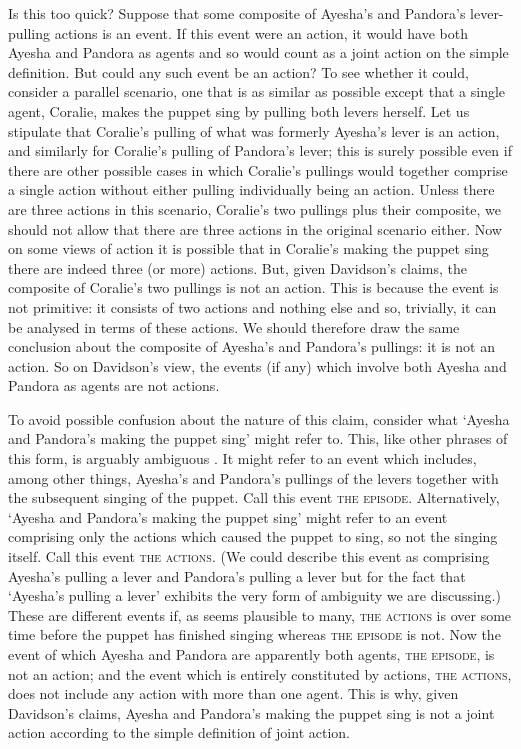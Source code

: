 \documentclass[12pt,a4paper]{extarticle}
\begin{document}
Is this too quick?  
Suppose that some composite of Ayesha's and Pandora's lever-pulling actions is an event.
If this event were an action, it would have both Ayesha and Pandora as agents and so would count as a joint action on the simple definition.
But could any such event be an action?
To see whether it could, 
consider a parallel scenario, one that is as similar as possible  except that a single agent, Coralie, makes the puppet sing by pulling both levers herself.
Let us stipulate that Coralie's pulling of what was formerly Ayesha's lever is an action, and similarly for Coralie's pulling of Pandora's lever; this is surely possible even if there are other possible cases in which Coralie's pullings would together comprise a single action without either pulling individually being an action.
Unless there are three actions in this scenario, Coralie's two pullings plus their composite, we should not allow that there are three actions in the original scenario either.
Now on  some views of action it is possible that in Coralie's making the puppet sing there are indeed three (or more) actions.
But, given Davidson's claims, the composite of Coralie's two pullings is not an action.
This is because the event is not primitive: it consists of two actions and nothing else and so, trivially, it can be analysed in terms of these actions.
We should therefore draw the same conclusion about the composite of Ayesha's and Pandora's pullings: it is not an action.
So on Davidson's view, the events (if any) which involve both Ayesha and Pandora as agents are not actions.

To avoid possible confusion about the nature of this claim, consider  what `Ayesha and Pandora's making the puppet sing' might refer to.
This, like other phrases of this form, is arguably ambiguous \citep[p.\ 84]{pietroski_actions_1998}. 
It might refer to an event which includes, among other things, Ayesha's and Pandora's pullings of the levers together with the subsequent singing of the puppet.
Call this event \textsc{the episode}.
Alternatively, `Ayesha and Pandora's making the puppet sing' might refer to an event comprising only the actions which caused the puppet to sing, so not the singing itself.
Call this event \textsc{the actions}.
(We could describe this event as comprising Ayesha's pulling a lever and Pandora's pulling a lever but for the fact that `Ayesha's pulling a lever' exhibits the very form of ambiguity we are discussing.)
These are different events if, as seems plausible to many, \textsc{the actions} is over some time before the puppet has finished singing whereas \textsc{the episode} is not.
Now the event of which Ayesha and Pandora are apparently both agents, \textsc{the episode}, is not an action;
and the event which is entirely constituted by actions, \textsc{the actions}, does not include any action with more than one agent.
This is why, given Davidson's claims, Ayesha and Pandora's making the puppet sing is not a joint action according to the simple definition of joint action.
\end{document}
